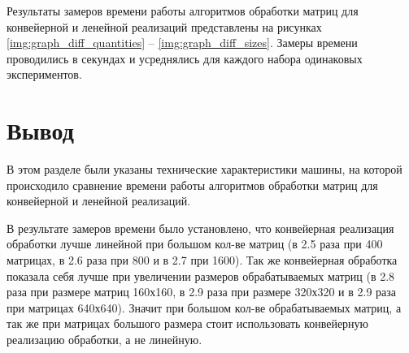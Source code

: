 Результаты замеров времени работы алгоритмов обработки матриц для конвейерной и ленейной реализаций представлены на рисунках \ref{img:graph_diff_quantities} -- \ref{img:graph_diff_sizes}. Замеры времени проводились в секундах и усреднялись для каждого набора одинаковых экспериментов.




\clearpage

\section{Вывод}

В этом разделе были указаны технические характеристики машины, на которой происходило сравнение времени работы алгоритмов обработки матриц для конвейерной и ленейной реализаций.

В результате замеров времени было установлено, что конвейерная реализация обработки лучше линейной
при большом кол-ве матриц (в 2.5 раза при 400 матрицах, в 2.6 раза при 800 и в 2.7 при 1600). Так же конвейерная обработка показала себя лучше при увеличении размеров обрабатываемых матриц (в 2.8 раза при размере матриц 160х160, в 2.9 раза при размере 320х320 и в 2.9 раза при матрицах 640х640). Значит при большом кол-ве обрабатываемых матриц, а так же при матрицах большого размера стоит использовать конвейерную реализацию обработки, а не линейную.


